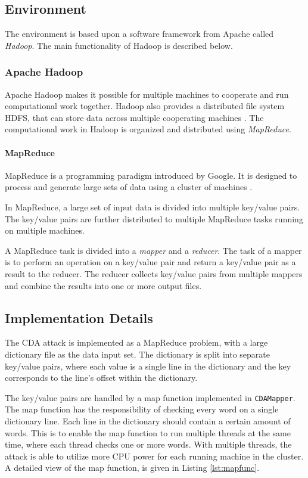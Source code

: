\documentclass[pdftex,english,10pt,b5paper,twoside]{book}
\begin{document}
\subsection{Environment}

The environment is based upon a software framework from Apache called
\emph{Hadoop}. The main functionality of Hadoop is described below.

\subsubsection{Apache Hadoop}

Apache Hadoop makes it possible for multiple machines to cooperate
and run computational work together. Hadoop also provides a distributed file system
\ac{HDFS}, that can store data across multiple cooperating machines \cite{hadoop}. The
computational work in Hadoop is organized and distributed using \emph{MapReduce}.

\paragraph{MapReduce} MapReduce is a programming paradigm introduced by Google.
It is designed to process and generate large sets of data using a cluster of
machines \cite{mapred}.

In MapReduce, a large set of input data is divided into multiple key/value
pairs. The key/value pairs are further distributed to multiple MapReduce tasks
running on multiple machines.

A MapReduce task is divided into a \emph{mapper} and a \emph{reducer}. The task
of a mapper is to perform an operation on a key/value pair and return a
key/value pair as a result to the reducer. The reducer collects key/value pairs
from multiple mappers and combine the results into one or more output files.

\subsection{Implementation Details}

The \ac{CDA} attack is implemented as a MapReduce problem, with a large
dictionary file as the data input set. The dictionary is split into separate
key/value pairs, where each value is a single line in the dictionary and the
key corresponds to the line's offset within the dictionary.

The key/value pairs are handled by a map function implemented in
\texttt{CDAMapper}. The
map function has the responsibility of checking every word on a single
dictionary line. Each line in the dictionary should contain a certain amount of
words. This is to enable the map function to run multiple threads at the same
time, where each thread checks one or more words. With multiple threads, the
attack is able to utilize more \ac{CPU} power for each running machine in the
cluster. A detailed view of the map function, is given in Listing
\ref{lst:mapfunc}.
\end{document}
